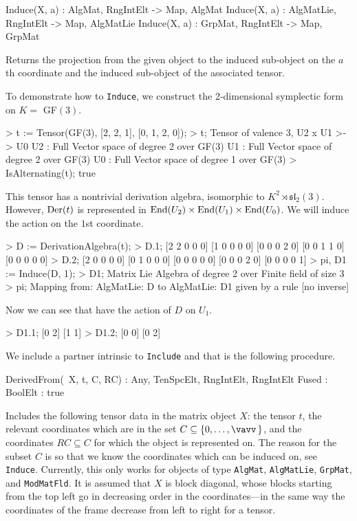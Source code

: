 \begin{intrinsics}
Induce(X, a) : AlgMat, RngIntElt -> Map, AlgMat
Induce(X, a) : AlgMatLie, RngIntElt -> Map, AlgMatLie
Induce(X, a) : GrpMat, RngIntElt -> Map, GrpMat
\end{intrinsics}

Returns the projection from the given object to the induced sub-object on the $a$th coordinate and the induced sub-object of the associated tensor.

\begin{example}[Inducing]

To demonstrate how to \texttt{Induce}, we construct the 2-dimensional symplectic form on $K =$ GF$(3)$. 
\begin{code}
> t := Tensor(GF(3), [2, 2, 1], [0, 1, 2, 0]);
> t;
Tensor of valence 3, U2 x U1 >-> U0
U2 : Full Vector space of degree 2 over GF(3)
U1 : Full Vector space of degree 2 over GF(3)
U0 : Full Vector space of degree 1 over GF(3)
> IsAlternating(t);
true
\end{code}

This tensor has a nontrivial derivation algebra, isomorphic to $K^2\rtimes \mathfrak{sl}_2(3)$. 
However, $\operatorname{Der}(t)$ is represented in $\operatorname{End}(U_2)\times\operatorname{End}(U_1)\times \operatorname{End}(U_0)$. 
We will induce the action on the $1$st coordinate.
\begin{code}
> D := DerivationAlgebra(t);
> D.1;
[2 2 0 0 0]
[1 0 0 0 0]
[0 0 0 2 0]
[0 0 1 1 0]
[0 0 0 0 0]
> D.2;
[2 0 0 0 0]
[0 1 0 0 0]
[0 0 0 0 0]
[0 0 0 2 0]
[0 0 0 0 1]
> pi, D1 := Induce(D, 1);
> D1;
Matrix Lie Algebra of degree 2 over Finite field of size 3
> pi;
Mapping from: AlgMatLie: D to AlgMatLie: D1 given by a rule [no inverse]
\end{code}

Now we can see that have the action of $D$ on $U_1$.
\begin{code}
> D1.1;
[0 2]
[1 1]
> D1.2;
[0 0]
[0 2]
\end{code}
\end{example}

We include a partner intrinsic to \texttt{Include} and that is the following procedure.

\begin{intrinsics}
DerivedFrom(~X, t, C, RC) : Any, TenSpcElt, {RngIntElt}, {RngIntElt}
    Fused : BoolElt : true
\end{intrinsics}

Includes the following tensor data in the matrix object $X$: the tensor $t$, the relevant coordinates which are in the set $C\subseteq \{0,\dots,\vav\}$, and the coordinates $RC\subseteq C$ for which the object is represented on.
The reason for the subset $C$ is so that we know the coordinates which can be induced on, see \texttt{Induce}.
Currently, this only works for objects of type \texttt{AlgMat}, \texttt{AlgMatLie}, \texttt{GrpMat}, and \texttt{ModMatFld}.
It is assumed that $X$ is block diagonal, whose blocks starting from the top left go in decreasing order in the coordinates---in the same way the coordinates of the frame decrease from left to right for a tensor. 

